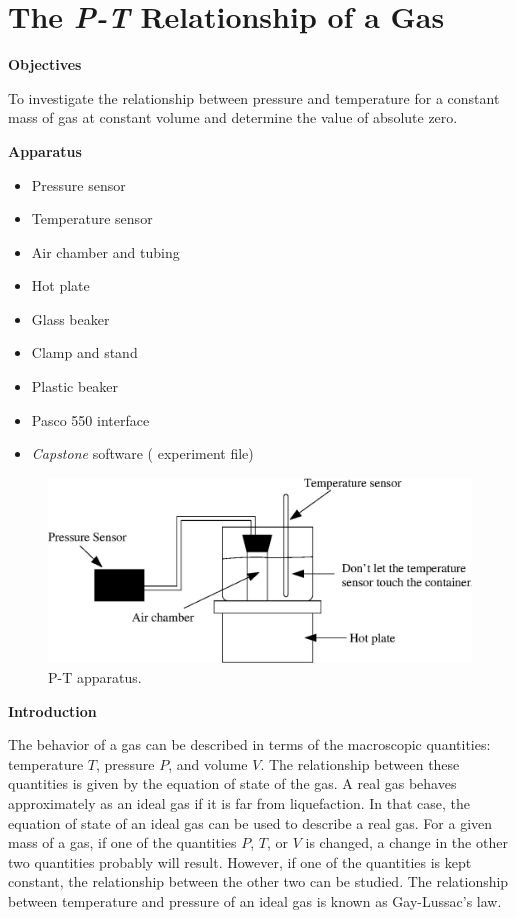 
\section{The \textit{P-T} Relationship of a Gas}

\makelabheader %

\bigskip
\textbf{Objectives} 

To investigate the relationship between pressure and temperature for
a constant mass of gas at constant volume and determine the value
of absolute zero.

\bigskip

\textbf{Apparatus} 

\begin{itemize}[nosep]
\item Pressure sensor
\item Temperature sensor
\item Air chamber and tubing
\item Hot plate
\item Glass beaker
\item Clamp and stand
\item Plastic beaker
\item Pasco 550 interface
\item \textit{Capstone} software ( experiment file)
\end{itemize}
\vspace{0.3cm}

\begin{figure}[hbt]
\begin{center}
\includegraphics[width=6.0in]{P-T_relationship_of_gas/P-T_fig1b.eps}
\caption{P-T apparatus.}
\end{center}
\end{figure}

\textbf{Introduction}

The behavior of a gas can be described in terms of the macroscopic quantities:
temperature $T$, pressure $P$, and volume $V$. The relationship between these
quantities is given by the equation of state of the gas. A real gas behaves
approximately as an ideal gas if it is far from liquefaction. In that case,
the equation of state of an ideal gas can be used to describe a real gas. For
a given mass of a gas, if one of the quantities $P$, $T$, or $V$ is changed, a change
in the other two quantities probably will result. However, if one of the 
quantities is kept constant, the relationship between the other two can be 
studied. The relationship between temperature and pressure of an ideal gas is 
known as Gay-Lussac's law.


